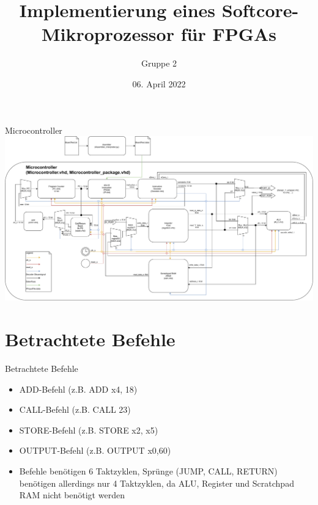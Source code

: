 \documentclass[10pt, t,
aspectratio=169,%
usenames,
dvipsnames,
]{beamer}
\title[Mikroprozessor Architektur] %
{Implementierung eines Softcore-Mikroprozessor für FPGAs}
\author[] %
{Gruppe 2}
\institute[] %
{
}
\date[] %
{06. April 2022}
\begin{document}
	\frame{\titlepage}
	\begin{frame}{Microcontroller}
		\includegraphics[width=.95\linewidth]{../Blockbeschreibungen/BlockdiagramMitVHDL.pdf}
	\end{frame}
	\section{Betrachtete Befehle}
	\begin{frame}{Betrachtete Befehle}
		\begin{itemize}
			\item ADD-Befehl (z.B. ADD x4, 18)
			\item CALL-Befehl (z.B. CALL 23)
			\item STORE-Befehl (z.B. STORE x2, x5)
			\item OUTPUT-Befehl (z.B. OUTPUT x0,60)
			\item Befehle benötigen 6 Taktzyklen, Sprünge (JUMP, CALL, RETURN) benötigen allerdings nur 4 Taktzyklen, da ALU, Register und Scratchpad RAM nicht benötigt werden
		\end{itemize}
	\end{frame}
\end{document}
